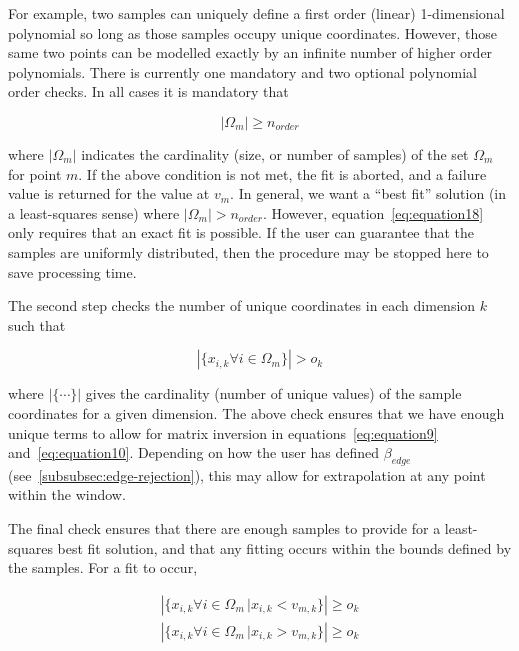 For example, two samples can uniquely define a first order (linear)
1-dimensional polynomial so long as those samples occupy unique coordinates.
However, those same two points can be modelled exactly by an infinite number of
higher order polynomials.
There is currently one mandatory and two optional polynomial order checks.
In all cases it is mandatory that

\begin{equation}
    | \Omega_m | \geq n_{order}
    \label{eq:equation18}
\end{equation}

where $| \Omega_m |$ indicates the cardinality (size, or number of samples) of
the set $\Omega_m$ for point $m$.
If the above condition is not met, the fit is aborted, and a failure value is
returned for the value at $v_m$.
In general, we want a ``best fit'' solution (in a least-squares sense) where
$| \Omega_m | > n_{order}$.
However, equation~\ref{eq:equation18} only requires that an exact fit is
possible.
If the user can guarantee that the samples are uniformly distributed, then
the procedure may be stopped here to save processing time.

The second step checks the number of unique coordinates in each dimension $k$
such that

\begin{equation}
    | \{ x_{i, k} \forall i \in \Omega_m \} | > o_k
    \label{eq:equation19}
\end{equation}

where $|\{\cdots\}|$ gives the cardinality (number of unique values) of the
sample coordinates for a given dimension.
The above check ensures that we have enough unique terms to allow for matrix
inversion in equations~\ref{eq:equation9} and~\ref{eq:equation10}.
Depending on how the user has defined $\beta_{edge}$
(see~\ref{subsubsec:edge-rejection}), this may allow for extrapolation at any
point within the window.

The final check ensures that there are enough samples to provide for a
least-squares best fit solution, and that any fitting occurs within the bounds
defined by the samples.
For a fit to occur,

\begin{align}
    |\{x_{i, k} \forall i \in \Omega_m \, \vert x_{i, k} < v_{m, k}\}| \geq o_k
    \nonumber \\
    |\{x_{i, k} \forall i \in \Omega_m \, \vert x_{i, k} > v_{m, k}\}| \geq o_k
    \label{eq:equation:20}
\end{align}

